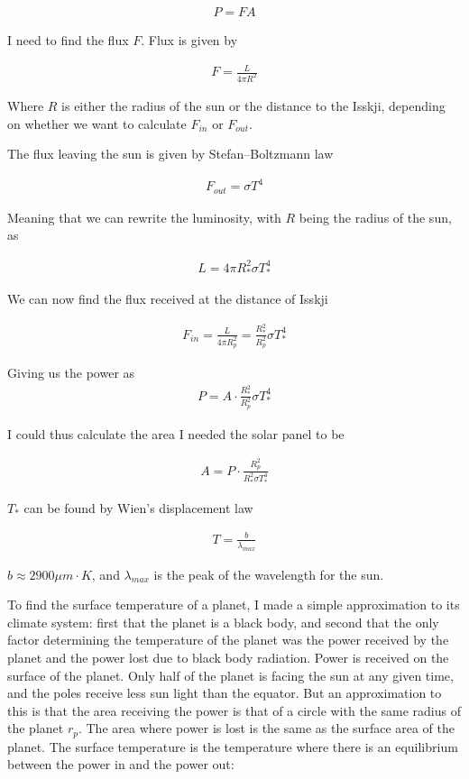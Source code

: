 \documentclass[a4paper, 10pt]{article}
\begin{document}
\begin{align}
P = FA
\end{align}

I need to find the flux $F$. Flux is given by

\begin{align}
F = \frac{L}{4\pi R^2}
\end{align}

Where $R$ is either the radius of the sun or the distance to the Isskji, depending on whether we want to calculate $F_{in}$ or $F_{out}$.

The flux leaving the sun is given by Stefan–Boltzmann law

\begin{align*}
F_{out} = \sigma T^4
\end{align*}

Meaning that we can rewrite the luminosity, with $R$ being the radius of the sun, as

\begin{align}
L = 4\pi R_*^2 \sigma T_*^4
\end{align}

We can now find the flux received at the distance of Isskji


\begin{align}
F_{in} = \frac{L}{4\pi R_p^2} = \frac{R_*^2}{R_p^2} \sigma T_*^4
\end{align}

Giving us the power as
\begin{align}
P = A \cdot \frac{R_*^2}{R_p^2} \sigma T_*^4
\end{align}

I could thus calculate the area I needed the solar panel to be

\begin{align}\label{eq:area}
A = P \cdot \frac{R_p^2}{R_*^2 \sigma T_*^4} 
\end{align}

$T_*$ can be found by Wien's displacement law

\begin{align}
T = \frac{b}{\lambda_{max}}
\end{align}

$b \approx 2900 \mu m \cdot K$, and $\lambda_{max}$ is the peak of the wavelength for the sun.

To find the surface temperature of a planet, I made a simple approximation to its climate system: first that the planet is a black body, and second that the only factor determining the temperature of the planet was the power received by the planet and the power lost due to black body radiation. Power is received on the surface of the planet. Only half of the planet is facing the sun at any given time, and the poles receive less sun light than the equator. But an approximation to this is that the area receiving the power is that of a circle with the same radius of the planet $r_p$. The area where power is lost is the same as the surface area of the planet. The surface temperature is the temperature where there is an equilibrium between the power in and the power out:
\end{document}
